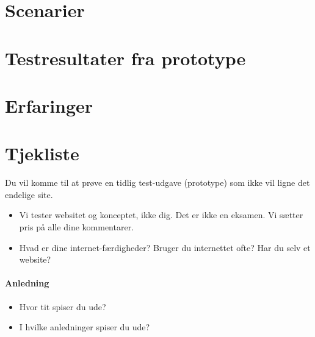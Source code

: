 \documentclass[a4paper, 12pt]{article}
\begin{document}
\section{Scenarier}
\label{sec:Scenarier}

\section{Testresultater fra prototype}
\label{sec:Testresultater fra prototype}

\section{Erfaringer}
\label{sec:Erfaringer}

\clearpage
\appendix

\section*{Tjekliste}

Du vil komme til at prøve en tidlig test-udgave (prototype) som ikke vil ligne det endelige site.
\begin{itemize}
\item Vi tester websitet og konceptet, ikke dig. Det er ikke en
  eksamen. Vi sætter pris på alle dine kommentarer.
\item Hvad er dine internet-færdigheder? Bruger du internettet ofte?
  Har du selv et website?
\end{itemize}

\paragraph{Anledning}
\begin{itemize}
\item Hvor tit spiser du ude?
\item I hvilke anledninger spiser du ude?
\end{itemize}
\end{document}
